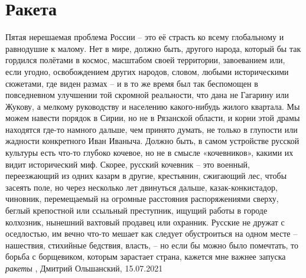  
 
 
 
 
\chapter{Ракета}
\label{sec:slova.raketa}

Пятая нерешаемая проблема России – это её страсть ко всему глобальному и равнодушие к малому.
Нет в мире, должно быть, другого народа, который бы так гордился полётами в
космос, масштабом своей территории, завоеванием или, если угодно, освобождением
других народов, словом, любыми историческими сюжетами, где виден размах – и в
то же время был так беспомощен в повседневном улучшении той скромной
реальности, что дана не Гагарину или Жукову, а мелкому руководству и населению
какого-нибудь жилого квартала. Мы можем навести порядок в Сирии, но не в
Рязанской области, и корни этой драмы находятся где-то намного дальше, чем
принято думать, не только в глупости или жадности конкретного Иван Иваныча.
Должно быть, в самом устройстве русской культуры есть что-то глубоко кочевое,
но не в смысле «кочевников», какими их видит исторический миф. Скорее, русский
кочевник – это военный, переезжающий из одних казарм в другие, крестьянин,
сжигающий лес, чтобы засеять поле, но через несколько лет двинуться дальше,
казак-конкистадор, чиновник, перемещаемый на огромные расстояния распоряжениями
сверху, беглый крепостной или ссыльный преступник, ищущий работы в городе
колхозник, нынешний вахтовый продавец или охранник. Русские не дружат с
оседлостью, им вечно что-то мешает как следует обустроиться на одном месте –
нашествия, стихийные бедствия, власть, – но если бы можно было помечтать, то
борьба с борщевиком, которым зарастает страна, кажется мне важнее запуска
\emph{ракеты}
, Дмитрий Ольшанский, 15.07.2021

